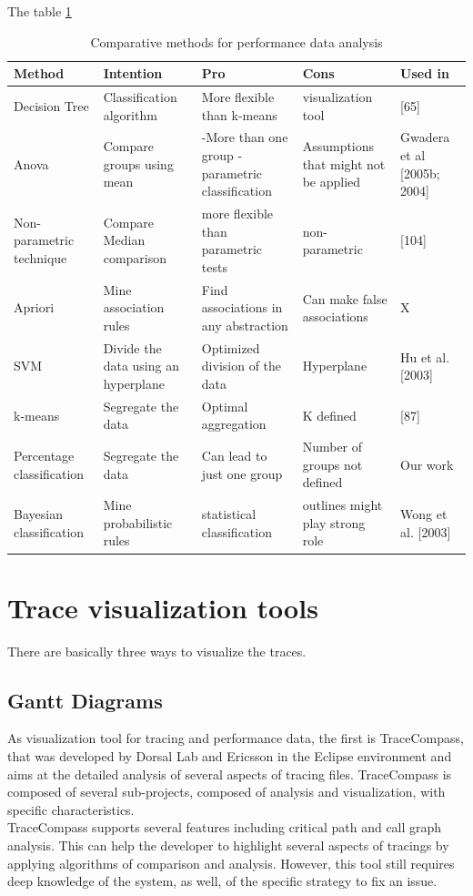 The table \ref{tab:performance_data_analysis}
 \begin{table}[h]
\centering
\caption{Comparative methods for performance data analysis}
\label{tab:performance_data_analysis}
\begin{tabular}{lllll}
\hline
Method &  Intention & Pro & Cons & Used in\\ \hline
Decision Tree & Classification algorithm & More flexible than k-means & visualization tool  & [65]\\ \hline
Anova & Compare groups using mean & -More than one group -parametric classification & Assumptions that might not be applied & Gwadera et al [2005b; 2004]\\ \hline
Non-parametric technique & Compare Median comparison & more flexible than parametric tests & non-parametric & [104]\\ \hline
Apriori & Mine association rules & Find associations in any abstraction & Can make false associations & X \\ \hline
SVM & Divide the data using an hyperplane & Optimized division of the data & Hyperplane & Hu et al. [2003]\\ \hline
k-means & Segregate the data & Optimal aggregation &K defined &[87]\\ \hline
Percentage classification &Segregate the data &Can lead to just one group &Number of groups not defined &Our work\\ \hline
Bayesian classification & Mine probabilistic rules & statistical classification & outlines might play strong role & Wong et al. [2003]
\end{tabular}
\end{table}

\section{Trace visualization tools}
There are basically three ways to visualize the traces.
\subsection{Gantt Diagrams}
As visualization tool for tracing and performance data, the first is TraceCompass, that was developed by Dorsal Lab and Ericsson in the Eclipse environment and aims at the detailed analysis of several aspects of tracing files. TraceCompass is composed of several sub-projects, composed of analysis and visualization, with specific characteristics.\\
TraceCompass supports several features including critical path and call graph analysis. This can help the developer to highlight several aspects of tracings by applying algorithms of comparison and analysis. However, this tool still requires deep knowledge of the system, as well, of the specific strategy to fix an issue.\\

